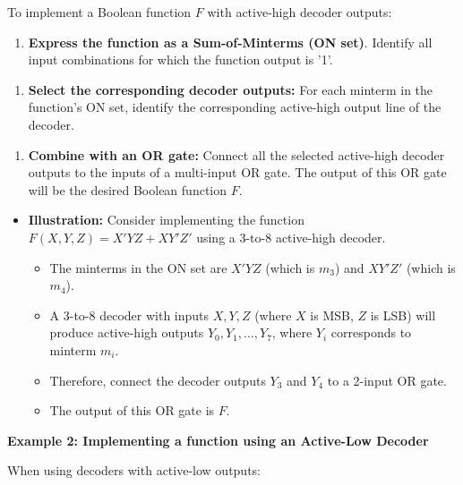 \documentclass{article}
\begin{document}
To implement a Boolean function $F$ with active-high decoder outputs:

\begin{enumerate}
\item \textbf{Express the function as a Sum-of-Minterms (ON set)}. Identify all input combinations for which the function output is '1'.

\end{enumerate}
\begin{enumerate}
\item \textbf{Select the corresponding decoder outputs:} For each minterm in the function's ON set, identify the corresponding active-high output line of the decoder.

\end{enumerate}
\begin{enumerate}
\item \textbf{Combine with an OR gate:} Connect all the selected active-high decoder outputs to the inputs of a multi-input OR gate. The output of this OR gate will be the desired Boolean function $F$.

\end{enumerate}
\begin{itemize}
    \item \textbf{Illustration:} Consider implementing the function $F(X,Y,Z) = X'YZ + XY'Z'$ using a 3-to-8 active-high decoder.

        \begin{itemize}
            \item The minterms in the ON set are $X'YZ$ (which is $m_3$) and $XY'Z'$ (which is $m_4$).
            \item A 3-to-8 decoder with inputs $X,Y,Z$ (where $X$ is MSB, $Z$ is LSB) will produce active-high outputs $Y_0, Y_1, \dots, Y_7$, where $Y_i$ corresponds to minterm $m_i$.
            \item Therefore, connect the decoder outputs $Y_3$ and $Y_4$ to a 2-input OR gate.
            \item The output of this OR gate is $F$.
        \end{itemize}
\end{itemize}

\textbf{Example 2: Implementing a function using an Active-Low Decoder}

When using decoders with active-low outputs:
\end{document}
